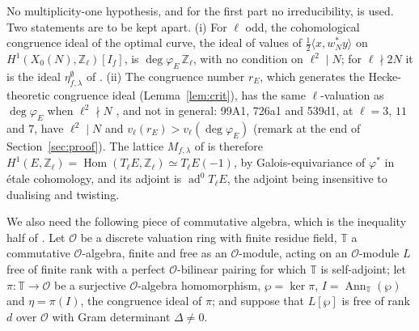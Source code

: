 \documentclass[11pt]{amsart}
\theoremstyle{definition}
\newcommand{\Z}{\mathbb{Z}}
\newcommand{\T}{\mathbb{T}}
\newcommand{\degphi}{\deg\varphi_E}
\newcommand{\ad}{\operatorname{ad}^0}
\begin{document}
No multiplicity-one hypothesis, and for the first part no irreducibility, is used. Two statements are to be kept apart. (i) For $\ell$ odd, the cohomological congruence ideal of the optimal curve, the ideal of values of $\frac12\langle x,w_N^*y\rangle$ on $H^1(X_0(N),\Z_\ell)[I_f]$, is $\degphi\,\Z_\ell$, with no condition on $\ell^2\mid N$; for $\ell\nmid2N$ it is the ideal $\eta^\emptyset_{f,\lambda}$ of \cite{DFG04}. (ii) The congruence number $r_E$, which generates the Hecke-theoretic congruence ideal (Lemma~\ref{lem:crit}), has the same $\ell$-valuation as $\degphi$ when $\ell^2\nmid N$ \cite[Theorem 2.2]{ARS12}, and not in general: 99A1, 726a1 and 539d1, at $\ell=3$, $11$ and $7$, have $\ell^2\mid N$ and $v_\ell(r_E)>v_\ell(\degphi)$ (remark at the end of Section~\ref{sec:proof}). The lattice $M_{f,\lambda}$ of \cite{DFG04} is therefore $H^1(E,\Z_\ell)=\operatorname{Hom}(T_\ell E,\Z_\ell)\simeq T_\ell E(-1)$, by Galois-equivariance of $\varphi^*$ in \'etale cohomology, and its adjoint is $\ad T_\ell E$, the adjoint being insensitive to dualising and twisting.

We also need the following piece of commutative algebra, which is the inequality half of \cite[Lemma 4.17]{DDT}. Let $\mathcal{O}$ be a discrete valuation ring with finite residue field, $\T$ a commutative $\mathcal{O}$-algebra, finite and free as an $\mathcal{O}$-module, acting on an $\mathcal{O}$-module $L$ free of finite rank with a perfect $\mathcal{O}$-bilinear pairing for which $\T$ is self-adjoint; let $\pi\colon\T\to\mathcal{O}$ be a surjective $\mathcal{O}$-algebra homomorphism, $\wp=\ker\pi$, $I=\operatorname{Ann}_\T(\wp)$ and $\eta=\pi(I)$, the congruence ideal of $\pi$; and suppose that $L[\wp]$ is free of rank $d$ over $\mathcal{O}$ with Gram determinant $\Delta\ne0$.
\end{document}

